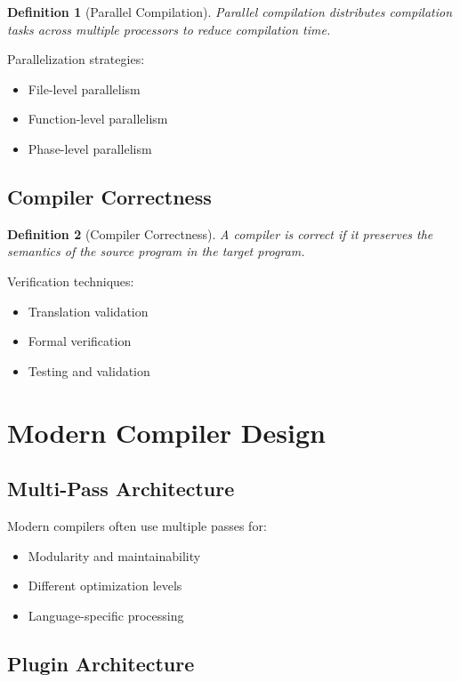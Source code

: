\documentclass[11pt]{article}
\newtheorem{definition}{Definition}[section]
\begin{document}
\begin{definition}[Parallel Compilation]
Parallel compilation distributes compilation tasks across multiple processors to reduce compilation time.
\end{definition}

Parallelization strategies:
\begin{itemize}
    \item File-level parallelism
    \item Function-level parallelism
    \item Phase-level parallelism
\end{itemize}

\subsection{Compiler Correctness}

\begin{definition}[Compiler Correctness]
A compiler is correct if it preserves the semantics of the source program in the target program.
\end{definition}

Verification techniques:
\begin{itemize}
    \item Translation validation
    \item Formal verification
    \item Testing and validation
\end{itemize}

\section{Modern Compiler Design}

\subsection{Multi-Pass Architecture}

Modern compilers often use multiple passes for:
\begin{itemize}
    \item Modularity and maintainability
    \item Different optimization levels
    \item Language-specific processing
\end{itemize}

\subsection{Plugin Architecture}
\end{document}
